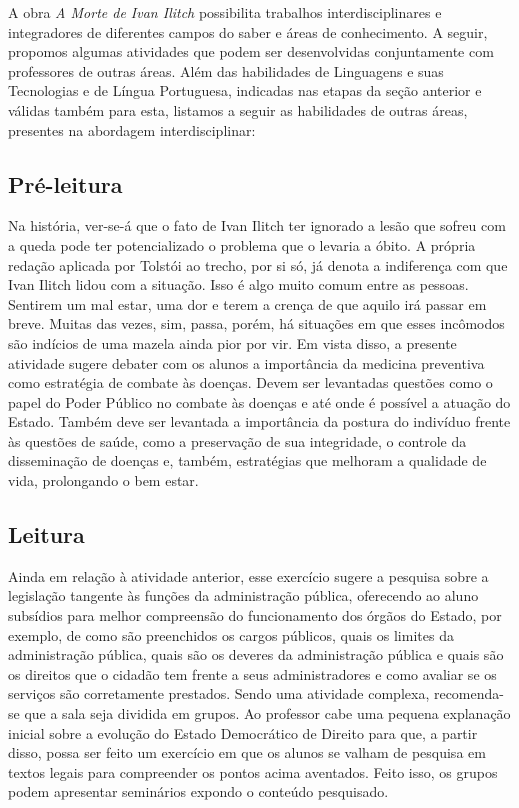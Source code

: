 \documentclass[12pt]{extarticle}
\begin{document}

A obra \emph{A Morte de Ivan Ilitch} possibilita trabalhos
interdisciplinares e integradores de diferentes campos do saber e áreas
de conhecimento. A seguir, propomos algumas atividades que podem ser
desenvolvidas conjuntamente com professores de outras áreas. Além das
habilidades de Linguagens e suas Tecnologias e de Língua Portuguesa,
indicadas nas etapas da seção anterior e válidas também para esta,
listamos a seguir as habilidades de outras áreas, presentes na abordagem
interdisciplinar:

\subsection{Pré-leitura}

Na história, ver-se-á que o fato de Ivan Ilitch ter ignorado
a lesão que sofreu com a queda pode ter potencializado o problema que o
levaria a óbito. A própria redação aplicada por Tolstói ao trecho, por
si só, já denota a indiferença com que Ivan Ilitch lidou com a situação.
Isso é algo muito comum entre as pessoas. Sentirem um mal estar, uma dor
e terem a crença de que aquilo irá passar em breve. Muitas das vezes,
sim, passa, porém, há situações em que esses incômodos são indícios de
uma mazela ainda pior por vir. Em vista disso, a presente atividade
sugere debater com os alunos a importância da medicina preventiva como
estratégia de combate às doenças. Devem ser levantadas questões como o
papel do Poder Público no combate às doenças e até onde é possível a
atuação do Estado. Também deve ser levantada a importância da postura do
indivíduo frente às questões de saúde, como a preservação de sua
integridade, o controle da disseminação de doenças e, também,
estratégias que melhoram a qualidade de vida, prolongando o bem estar.

\subsection{Leitura}

Ainda em relação à atividade anterior, esse exercício sugere
a pesquisa sobre a legislação tangente às funções da administração
pública, oferecendo ao aluno subsídios para melhor compreensão do
funcionamento dos órgãos do Estado, por exemplo, de como são preenchidos
os cargos públicos, quais os limites da administração pública, quais são
os deveres da administração pública e quais são os direitos que o
cidadão tem frente a seus administradores e como avaliar se os serviços
são corretamente prestados. Sendo uma atividade complexa, recomenda-se
que a sala seja dividida em grupos. Ao professor cabe uma pequena
explanação inicial sobre a evolução do Estado Democrático de Direito
para que, a partir disso, possa ser feito um exercício em que os alunos
se valham de pesquisa em textos legais para compreender os pontos acima
aventados. Feito isso, os grupos podem apresentar seminários expondo o
conteúdo pesquisado.
\end{document}

